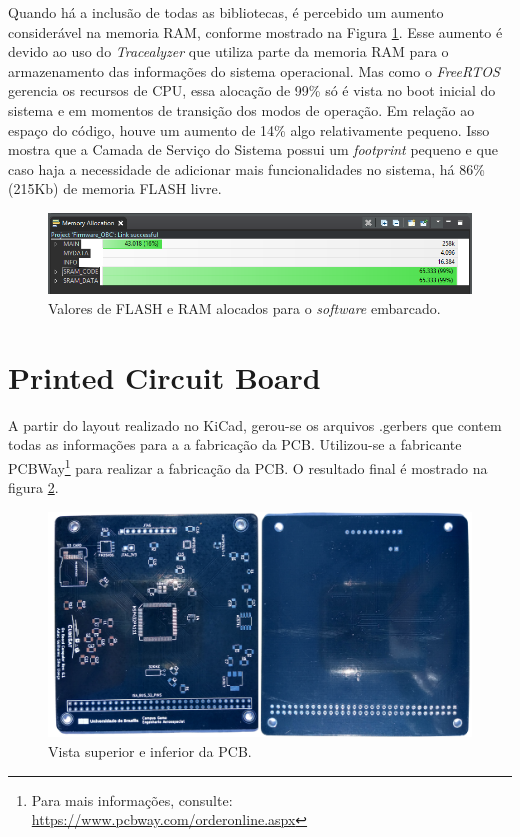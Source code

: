 Quando há a inclusão de todas as bibliotecas, é percebido um aumento considerável na memoria RAM, conforme mostrado na Figura \ref{memoryAllocation_Full}. Esse aumento é devido ao uso do \textit{Tracealyzer} que utiliza parte da memoria RAM para o armazenamento das informações do sistema operacional. Mas como o \textit{FreeRTOS} gerencia os recursos de CPU, essa alocação de 99\% só é vista no boot inicial do sistema e em momentos de transição dos modos de operação. Em relação ao espaço do código, houve um aumento de 14\% algo relativamente pequeno. Isso mostra que a Camada de Serviço do Sistema possui um \textit{footprint} pequeno e que caso haja a necessidade de adicionar mais funcionalidades no sistema, há 86\% (215Kb) de memoria FLASH livre. 

\begin{figure}[h]
	\centering

	\includegraphics[keepaspectratio=true,scale=0.64]{figuras/memoryAllocation_Full.PNG}
	\caption{Valores de FLASH e RAM alocados para o \textit{software} embarcado.}	
	\label{memoryAllocation_Full}
\end{figure}
\FloatBarrier

\newpage
\section{Printed Circuit Board}

A partir do layout realizado no KiCad, gerou-se os arquivos .gerbers que contem todas as informações para a a fabricação da PCB. Utilizou-se a fabricante PCBWay\footnote{Para mais informações, consulte: \url{https://www.pcbway.com/orderonline.aspx}} para realizar a fabricação da PCB. O resultado final é mostrado na figura \ref{pcb_bothSides}.


\begin{figure}[h]
	\centering
	
	\includegraphics[keepaspectratio=true,scale=0.7]{figuras/pcb_bothSides.png}
	\caption{Vista superior e inferior da PCB.}
	\label{pcb_bothSides}
\end{figure}
\FloatBarrier

